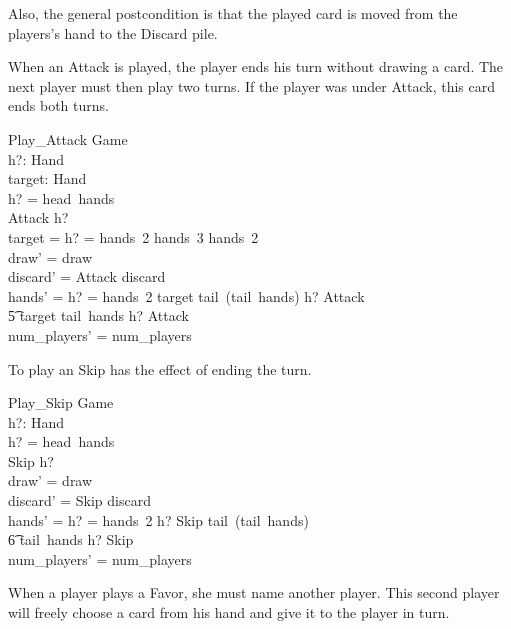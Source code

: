 \documentclass[11pt, fuzz]{article}
\begin{document}
Also, the general postcondition is that the played card is moved from the players's hand to the Discard pile. 

When an Attack is played, the player ends his turn without drawing a card. The next player must then play two turns. If the player was under Attack, this card ends both turns.  

\begin{schema}{Play\_Attack}
    \Delta Game \\
    h?: Hand \\
    target: Hand \\
\where
    h? = head~hands \\
    Attack \inbag h? \\
    target = \IF h? = hands~2 \THEN hands~3 \ELSE hands~2\\
    draw' = draw \\
    discard' = \langle Attack \rangle \cat discard \\
    hands' = \IF h? = hands~2 \THEN \langle target \rangle \cat tail~(tail~hands) \cat \langle h? \uminus \lbag Attack \rbag \rangle \\ \t5 \ELSE \langle target \rangle \cat tail~hands \cat \langle h? \uminus \lbag Attack \rbag \rangle  \\
    num\_players' = num\_players
\end{schema}

To play an Skip has the effect of ending the turn. 

\begin{schema}{Play\_Skip}
    \Delta Game \\
    h?: Hand \\
\where
    h? = head~hands \\
    Skip \inbag h? \\
    draw' = draw \\ 
    discard' = \langle Skip \rangle \cat discard \\
    hands' = \IF h? = hands~2 \THEN \langle h? \uminus \lbag Skip \rbag \rangle \cat tail~(tail~hands) \\ \t6 \ELSE tail~hands \cat \langle h? \uminus \lbag Skip \rbag \rangle \\
    num\_players' = num\_players
\end{schema}

When a player plays a Favor, she must name another player. This second player will freely choose a card from his hand and give it to the player in turn. 
\end{document}
